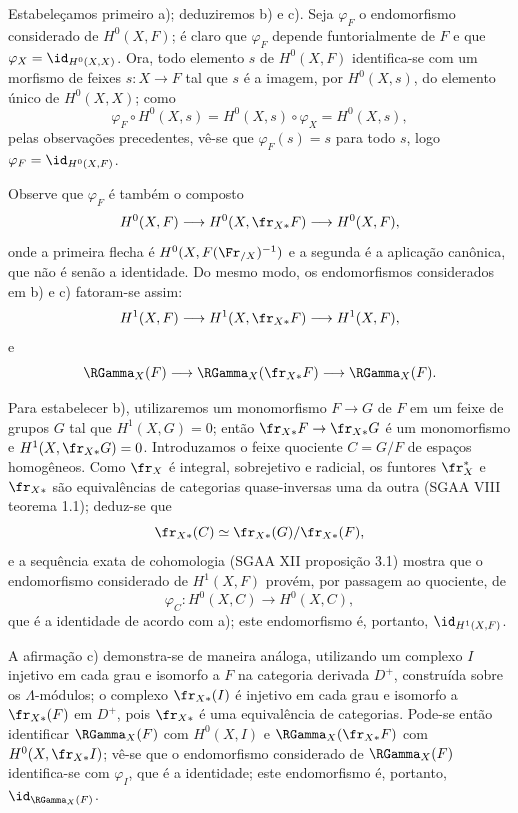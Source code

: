 Estabeleçamos primeiro a); deduziremos b) e c). Seja $\varphi_F$ o endomorfismo considerado de $H^0(X,F)$; é claro que $\varphi_F$ depende funtorialmente de $F$ e que $\varphi_X=\id_{H^0(X,X)}$. Ora, todo elemento $s$ de $H^0(X,F)$ identifica-se com um morfismo de feixes $s:X\to F$ tal que $s$ é a imagem, por $H^0(X,s)$, do elemento único de $H^0(X,X)$; como
\[
\varphi_F\circ H^0(X,s)=H^0(X,s)\circ\varphi_X=H^0(X,s),
\]
pelas observações precedentes, vê-se que $\varphi_F(s)=s$ para todo $s$, logo $\varphi_F=\id_{H^0(X,F)}$.

Observe que $\varphi_F$ é também o composto
\[
H^0(X,F)\longrightarrow H^0(X,\fr_{X*}F)
\longrightarrow H^0(X,F),
\]
onde a primeira flecha é $H^0(X,F(\Fr_{/X})^{-1})$ e a segunda é a aplicação canônica, que não é senão a identidade. Do mesmo modo, os endomorfismos considerados em b) e c) fatoram-se assim:
\[
H^1(X,F)\longrightarrow H^1(X,\fr_{X*}F)
\longrightarrow H^1(X,F),
\]
e
\[
\RGamma_X(F)\longrightarrow \RGamma_X(\fr_{X*}F)
\longrightarrow \RGamma_X(F).
\]

Para estabelecer b), utilizaremos um monomorfismo $F\to G$ de $F$ em um feixe de grupos $G$ tal que $H^1(X,G)=0$; então $\fr_{X*}F\to\fr_{X*}G$ é um monomorfismo e $H^1(X,\fr_{X*}G)=0$. Introduzamos o feixe quociente $C=G/F$ de espaços homogêneos. Como $\fr_X$ é integral, sobrejetivo e radicial, os funtores $\fr_X^*$ e $\fr_{X*}$ são equivalências de categorias quase-inversas uma da outra (SGAA VIII teorema 1.1); deduz-se que
\[
\fr_{X*}(C)\simeq\fr_{X*}(G)/\fr_{X*}(F),
\]
e a sequência exata de cohomologia (SGAA XII proposição 3.1) mostra que o endomorfismo considerado de $H^1(X,F)$ provém, por passagem ao quociente, de
\[
\varphi_C:H^0(X,C)\longrightarrow H^0(X,C),
\]
que é a identidade de acordo com a); este endomorfismo é, portanto, $\id_{H^1(X,F)}$.

A afirmação c) demonstra-se de maneira análoga, utilizando um complexo $I$ injetivo em cada grau e isomorfo a $F$ na categoria derivada $D^+$, construída sobre os $\Lambda$-módulos; o complexo $\fr_{X*}(I)$ é injetivo em cada grau e isomorfo a $\fr_{X*}(F)$ em $D^+$, pois $\fr_{X*}$ é uma equivalência de categorias. Pode-se então identificar $\RGamma_X(F)$ com $H^0(X,I)$ e $\RGamma_X(\fr_{X*}F)$ com $H^0(X,\fr_{X*}I)$; vê-se que o endomorfismo considerado de $\RGamma_X(F)$ identifica-se com $\varphi_I$, que é a identidade; este endomorfismo é, portanto, $\id_{\RGamma_X(F)}$.
